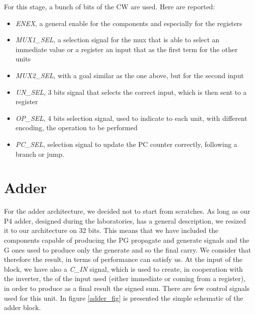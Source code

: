 For this stage, a bunch of bits of the \textsf{CW} are used. Here are reported:
\begin{itemize}
	\item \textit{ENEX}, a general enable for the components and especially for the registers
	\item \textit{MUX1\_SEL}, a selection signal for the mux that is able to select an immediate value or a register an input that as the first term for the other units
	\item \textit{MUX2\_SEL}, with a goal similar as the one above, but for the second input
	\item \textit{UN\_SEL}, 3 bits signal that selects the correct input, which is then sent to a register
	\item \textit{OP\_SEL}, 4 bits selection signal, used to indicate to each unit, with different encoding, the operation to be performed
	\item \textit{PC\_SEL}, selection signal to update the PC counter correctly, following a branch or jump.
\end{itemize}


\section{Adder}

For the adder architecture, we decided not to start from scratches. As long as our P4 adder, designed during the laboratories, has a general description, we resized it to our architecture on 32 bits. This means that we have included the components capable of producing the \textsf{PG} propagate and generate signals and the \textsc{G} ones used to produce only the generate and so the final carry. We consider that therefore the result, in terms of performance can satisfy us. At the input of the block, we have also a \textit{C\_IN} signal, which is used to create, in cooperation with the inverter, the  of the input used (either immediate or coming from a register), in order to produce as a final result the signed sum. There are few control signals used for this unit. In figure \ref{adder_fig} is presented the simple schematic of the adder block.

